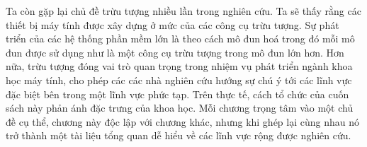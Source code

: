 Ta còn gặp lại chủ đề trừu tượng nhiều lần trong nghiên cứu. Ta sẽ thấy rằng các thiết bị
máy tính được xây dựng ở mức của các công cụ trừu tượng.  Sự phát triển của các hệ thống
phần mềm lớn là theo cách mô đun hoá trong đó mỗi mô đun được sử dụng như là một công cụ
trừu tượng trong mô đun lớn hơn. Hơn nữa, trừu tượng đóng vai trò quan trọng trong nhiệm
vụ phát triển ngành khoa học máy tính, cho phép các các nhà nghiên cứu hướng sự chú ý tới
các lĩnh vực đặc biệt bên trong một lĩnh vực phức tạp. Trên thực tế, cách tổ chức của cuốn
sách này phản ánh đặc trưng của khoa học. Mỗi chương trọng tâm vào một chủ đề cụ thể,
chương này độc lập với chương khác, nhưng khi ghép lại cùng nhau nó trở thành một tài liệu
tổng quan dễ hiểu về các lĩnh vực rộng được nghiên cứu.

